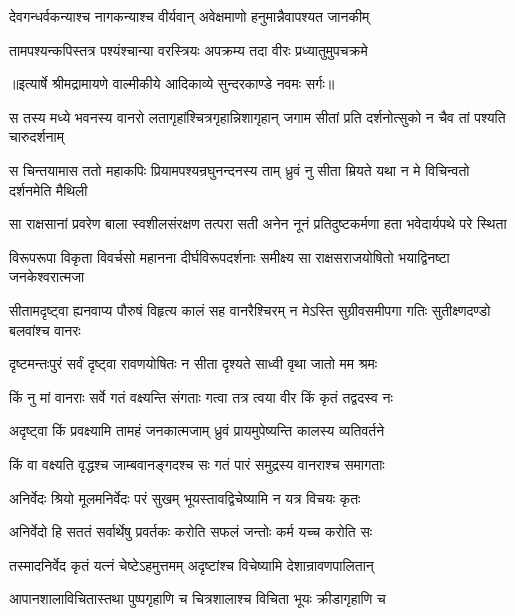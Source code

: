 \twolineshloka
{देवगन्धर्वकन्याश्च नागकन्याश्च वीर्यवान्}
{अवेक्षमाणो हनुमान्नैवापश्यत जानकीम्} %

\twolineshloka
{तामपश्यन्कपिस्तत्र पश्यंश्चान्या वरस्त्रियः}
{अपक्रम्य तदा वीरः प्रध्यातुमुपचक्रमे} %


{॥इत्यार्षे श्रीमद्रामायणे वाल्मीकीये आदिकाव्ये सुन्दरकाण्डे नवमः सर्गः॥}


\fourlineindentedshloka
{स तस्य मध्ये भवनस्य वानरो}
{ लतागृहांश्चित्रगृहान्निशागृहान्}
{जगाम सीतां प्रति दर्शनोत्सुको}
{ न चैव तां पश्यति चारुदर्शनाम्} %

\fourlineindentedshloka
{स चिन्तयामास ततो महाकपिः}
{ प्रियामपश्यन्रघुनन्दनस्य ताम्}
{ध्रुवं नु सीता म्रियते यथा न मे}
{ विचिन्वतो दर्शनमेति मैथिली} %

\fourlineindentedshloka
{सा राक्षसानां प्रवरेण बाला}
{ स्वशीलसंरक्षण तत्परा सती}
{अनेन नूनं प्रतिदुष्टकर्मणा}
{ हता भवेदार्यपथे परे स्थिता} %

\fourlineindentedshloka
{विरूपरूपा विकृता विवर्चसो}
{ महानना दीर्घविरूपदर्शनाः}
{समीक्ष्य सा राक्षसराजयोषितो}
{ भयाद्विनष्टा जनकेश्वरात्मजा} %

\fourlineindentedshloka
{सीतामदृष्ट्वा ह्यनवाप्य पौरुषं}
{ विहृत्य कालं सह वानरैश्चिरम्}
{न मेऽस्ति सुग्रीवसमीपगा गतिः}
{ सुतीक्ष्णदण्डो बलवांश्च वानरः} %

\twolineshloka
{दृष्टमन्तःपुरं सर्वं दृष्ट्वा रावणयोषितः}
{न सीता दृश्यते साध्वी वृथा जातो मम श्रमः} %

\twolineshloka
{किं नु मां वानराः सर्वे गतं वक्ष्यन्ति संगताः}
{गत्वा तत्र त्वया वीर किं कृतं तद्वदस्व नः} %

\twolineshloka
{अदृष्ट्वा किं प्रवक्ष्यामि तामहं जनकात्मजाम्}
{ध्रुवं प्रायमुपेष्यन्ति कालस्य व्यतिवर्तने} %

\twolineshloka
{किं वा वक्ष्यति वृद्धश्च जाम्बवानङ्गदश्च सः}
{गतं पारं समुद्रस्य वानराश्च समागताः} %

\twolineshloka
{अनिर्वेदः श्रियो मूलमनिर्वेदः परं सुखम्}
{भूयस्तावद्विचेष्यामि न यत्र विचयः कृतः} %

\twolineshloka
{अनिर्वेदो हि सततं सर्वार्थेषु प्रवर्तकः}
{करोति सफलं जन्तोः कर्म यच्च करोति सः} %

\twolineshloka
{तस्मादनिर्वेद कृतं यत्नं चेष्टेऽहमुत्तमम्}
{अदृष्टांश्च विचेष्यामि देशान्रावणपालितान्} %

\twolineshloka
{आपानशालाविचितास्तथा पुष्पगृहाणि च}
{चित्रशालाश्च विचिता भूयः क्रीडागृहाणि च} %

